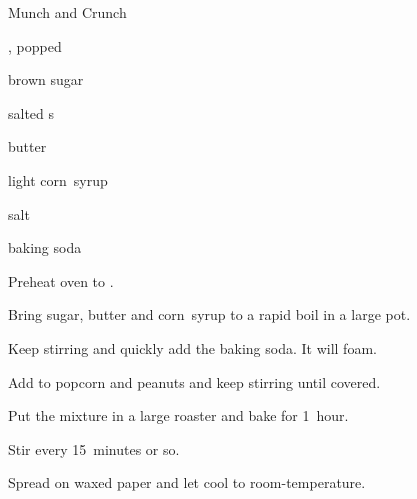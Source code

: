 \begin{recipe}{Munch and Crunch}{}{}

\begin{ingredients}
\item {} , popped
\item {} brown sugar
\item \C{1\half} salted s
\item {} butter
\item \C{\half} light corn~syrup
\item {} salt
\item \tp{\half} baking soda
\end{ingredients}

\begin{directions}
\item Preheat oven to .
\item Bring sugar, butter and corn~syrup to a rapid boil in a large pot.
\item Keep stirring and quickly add the baking soda. It will foam.
\item Add to popcorn and peanuts and keep stirring until covered.
\item Put the mixture in a large roaster and bake for 1~hour.
\item Stir every 15~minutes or so.
\item Spread on waxed paper and let cool to room-temperature.
\end{directions}
\end{recipe}
